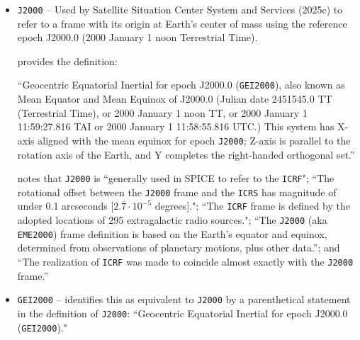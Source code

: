 \documentclass[draft]{agujournal2019}
\begin{document}
\begin{itemize}
    \parskip 0.1in 

    \item \texttt{J2000} -- Used by Satellite Situation Center System and Services (2025c) to refer to a frame with its origin at Earth’s center of mass  using the reference epoch J2000.0 (2000 January 1 noon Terrestrial Time).
    
      provides the definition:
     
     ``Geocentric Equatorial Inertial for epoch J2000.0 (\texttt{GEI2000}), also known as Mean Equator and Mean Equinox of J2000.0 (Julian date 2451545.0 TT (Terrestrial Time), or 2000 January 1 noon TT, or 2000 January 1 11:59:27.816 TAI or 2000 January 1 11:58:55.816 UTC.) This system has X-axis aligned with the mean equinox for epoch \texttt{J2000}; Z-axis is parallel to the rotation axis of the Earth, and Y completes the right-handed orthogonal set.''


     notes that \texttt{J2000} is ``generally used in SPICE to refer to the \texttt{ICRF}"; ``The rotational offset between the \texttt{J2000} frame and the \texttt{ICRS} has magnitude of under 0.1 arcseconds [$2.\overline{7}\cdot 10^{-5}$ degrees]."; ``The \texttt{ICRF} frame is defined by the adopted locations of 295 extragalactic radio sources."; ``The \texttt{J2000} (aka \texttt{EME2000}) frame definition is based on the Earth’s equator and equinox, determined from observations of planetary motions, plus other data.''; and ``The realization of \texttt{ICRF} was made to coincide almost exactly with the \texttt{J2000} frame.'' 



    \item \texttt{GEI2000} --  identifies this as equivalent to \texttt{J2000} by a parenthetical statement in the definition of \texttt{J2000}: ``Geocentric Equatorial Inertial for epoch J2000.0 (\texttt{GEI2000})."


\end{itemize}
\end{document}

